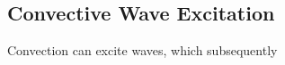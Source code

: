 {\color{purple}
\subsection{Convective Wave Excitation}
}

Convection can excite waves, which subsequently 
